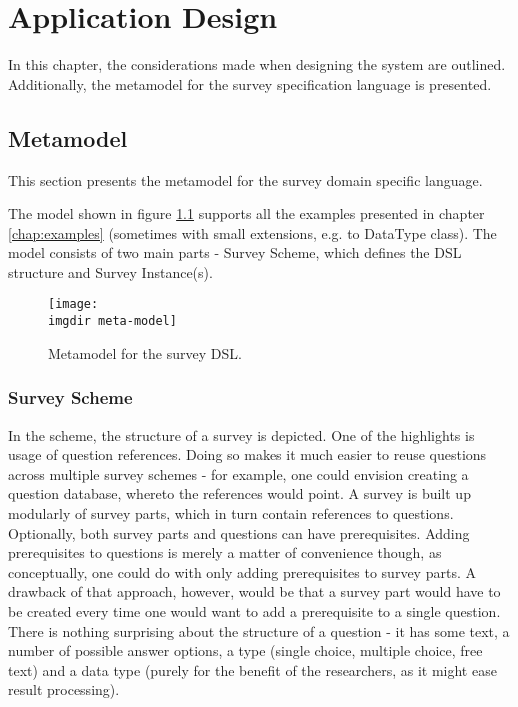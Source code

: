\chapter{Application Design}
\label{chap:design}
In this chapter, the considerations made when designing the system are outlined. Additionally, the metamodel for the survey specification language is presented.

\section{Metamodel}
\label{sec:metamodel}
This section presents the metamodel for the survey domain specific language.  

The model shown in figure \ref{fig:metamodel} supports all the examples presented in chapter \ref{chap:examples} (sometimes with small extensions, e.g. to DataType class).
The model consists of two main parts - Survey Scheme, which defines the DSL structure and Survey Instance(s).

\begin{figure}[!htbp]
  \texttt{[image: \\imgdir meta-model]}
  \caption{Metamodel for the survey DSL.}
  \label{fig:metamodel}
\end{figure}

\subsection{Survey Scheme}
\label{subsec:surveyscheme}
In the scheme, the structure of a survey is depicted. One of the highlights is usage of question references. Doing so makes it much easier to reuse questions across multiple survey schemes - for example, one could envision creating a question database, whereto the references would point.
A survey is built up modularly of survey parts, which in turn contain references to questions. Optionally, both survey parts and questions can have prerequisites. Adding prerequisites to questions is merely a matter of convenience though, as conceptually, one could do with only adding prerequisites to survey parts. A drawback of that approach, however, would be that a survey part would have to be created every time one would want to add a prerequisite to a single question.
There is nothing surprising about the structure of a question - it has some text, a number of possible answer options, a type (single choice, multiple choice, free text) and a data type (purely for the benefit of the researchers, as it might ease result processing).

